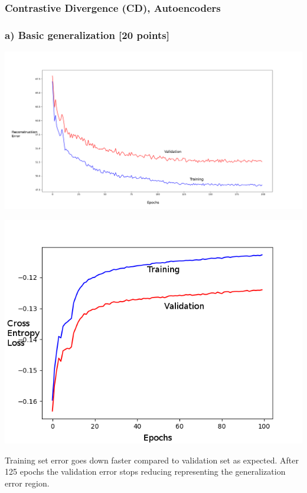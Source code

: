 \documentclass[10pt]{article}
\begin{document}
\subsubsection*{Contrastive Divergence (CD), Autoencoders}


\subsubsection*{a) Basic generalization [20 points]}

\includegraphics[scale=0.2]{rbm_recon_error.png}

\includegraphics[scale=0.6]{rbm_loss.png}

Training set error goes down faster compared to validation set as expected. After 125 epochs the validation error stops reducing representing the generalization error region.
\end{document}
